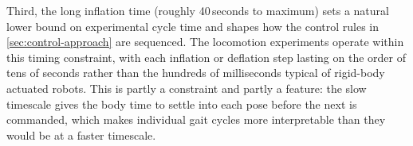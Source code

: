Third, the long inflation time (roughly 40\,seconds to maximum) sets a natural lower bound on experimental cycle time and shapes how the control rules in \cref{sec:control-approach} are sequenced. The locomotion experiments operate within this timing constraint, with each inflation or deflation step lasting on the order of tens of seconds rather than the hundreds of milliseconds typical of rigid-body actuated robots. This is partly a constraint and partly a feature: the slow timescale gives the body time to settle into each pose before the next is commanded, which makes individual gait cycles more interpretable than they would be at a faster timescale.
